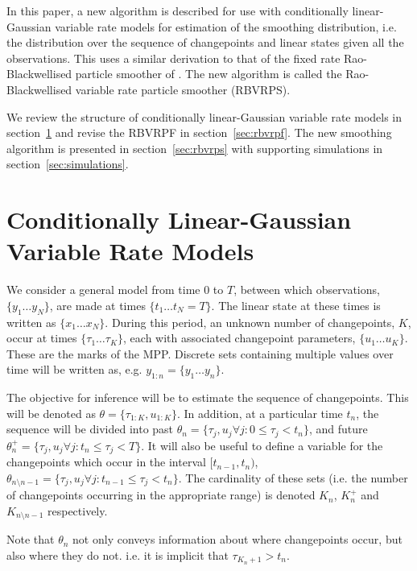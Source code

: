 \documentclass[journal]{IEEEtran}
\begin{document}
In this paper, a new algorithm is described for use with conditionally linear-Gaussian variable rate models for estimation of the smoothing distribution, i.e. the distribution over the sequence of changepoints and linear states given all the observations. This uses a similar derivation to that of the fixed rate Rao-Blackwellised particle smoother of \cite{Sarkka2012}. The new algorithm is called the Rao-Blackwellised variable rate particle smoother (RBVRPS).

We review the structure of conditionally linear-Gaussian variable rate models in section~\ref{sec:rbvr_models} and revise the RBVRPF in section~\ref{sec:rbvrpf}. The new smoothing algorithm is presented in section~\ref{sec:rbvrps} with supporting simulations in section~\ref{sec:simulations}.



\section{Conditionally Linear-Gaussian Variable Rate Models} \label{sec:rbvr_models}

We consider a general model from time $0$ to $T$, between which observations, $\{y_1 \dots y_N\}$, are made at times $\{t_1 \dots t_N = T\}$. The linear state at these times is written as $\{x_1 \dots x_N\}$. During this period, an unknown number of changepoints, $K$, occur at times $\{ \tau_1 \dots \tau_K \}$, each with associated changepoint parameters, $\{ u_1 \dots u_K \}$. These are the marks of the MPP. Discrete sets containing multiple values over time will be written as, e.g. $y_{1:n} = \{y_1 \dots y_n\}$.

The objective for inference will be to estimate the sequence of changepoints. This will be denoted as $\theta = \{\tau_{1:K}, u_{1:K}\}$. In addition, at a particular time $t_n$, the sequence will be divided into past $\theta_n = \{\tau_{j}, u_{j} \forall j : 0 \leq \tau_j < t_n \}$, and future $\theta_n^+ = \{\tau_{j}, u_{j} \forall j : t_n \leq \tau_j < T \}$. It will also be useful to define a variable for the changepoints which occur in the interval $[t_{n-1},t_n)$, $\theta_{n \setminus n-1} = \{\tau_{j}, u_{j} \forall j : t_{n-1} \leq \tau_j < t_n \}$. The cardinality of these sets (i.e. the number of changepoints occurring in the appropriate range) is denoted $K_n$, $K_n^+$ and $K_{n \setminus n-1}$ respectively.

Note that $\theta_n$ not only conveys information about where changepoints occur, but also where they do not. i.e. it is implicit that $\tau_{K_n+1} > t_n$.%
\end{document}
